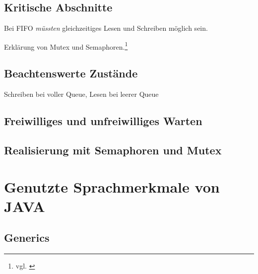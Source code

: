 
\subsection{Kritische Abschnitte} %
\label{sub:kritische_abschnitte}

Bei \ac{FIFO} \textit{müssten} gleichzeitiges Lesen und Schreiben möglich sein.

Erklärung von Mutex und Semaphoren.\footnote{vgl. \cite{oscon}}


\subsection{Beachtenswerte Zustände} %
\label{sub:beachtenswerte_zustande}

Schreiben bei voller Queue, Lesen bei leerer Queue


\subsection{Freiwilliges und unfreiwilliges Warten} %
\label{sub:freiwilliges_und_unfreiwilliges_warten}


\subsection{Realisierung mit Semaphoren und Mutex} %
\label{sub:realisierung_mit_semaphoren_und_mutex}



\newpage
\section{Genutzte Sprachmerkmale von JAVA} %
\label{sec:genutzte_sprachmerkmale_von_java}

\subsection{Generics} %
\label{sub:generics}


